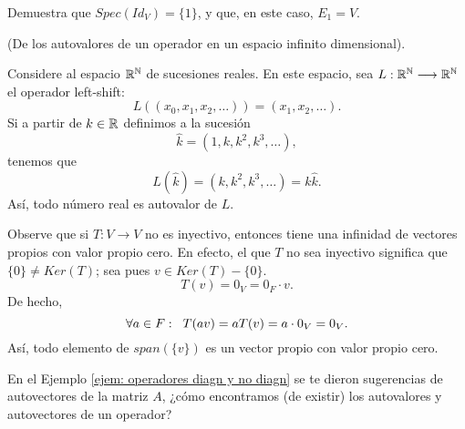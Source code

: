  Demuestra que $Spec(Id_{V}) = \{1\}$, y que, en 
este caso, $E_{1} = V$.

\begin{ejem}
	(De los autovalores de un operador en un espacio infinito dimensional).
	
	Considere al espacio $\mathbb{R}^{\mathbb{N}}$ de sucesiones reales. En este espacio,
	sea $L: \mathbb{R}^{\mathbb{N}} \longrightarrow \mathbb{R}^{\mathbb{N}}$ el operador 
	left-shift:
	\[
	L((x_{0}, x_{1}, x_{2}, \ldots  )) = (
	x_{1}, x_{2}, \ldots
	).
	\]
	Si a partir de $k \in \mathbb{R}$ definimos a la sucesión
	\[
	\hat{k} = (1, k, k^{2}, k^{3}, \ldots),
	\]
	tenemos que 
	\[
	L(\hat{k}) = (k, k^{2}, k^{3}, \ldots) = 
	k \hat{k}.
	\]
	Así, todo número real es autovalor de $L$.
\end{ejem}



\begin{ejem}
Observe que si $T: V \longrightarrow V$ no es inyectivo, entonces
tiene una infinidad de vectores propios con valor propio cero.
En efecto, el que $T$ no sea inyectivo significa que 
$\{ 0 \} \neq Ker(T)$; sea pues $v \in Ker(T)- \{ 0 \}$.
\[
T(v) = 0_{V} = 0_{F} \cdot v.
\]
De hecho, 
\[
\forall a \in F: \hspace{0.2cm} 
T(av) = a T(v) = a \cdot 0_{V} = 0_{V}.
\]
Así, todo elemento de $span(\{v\})$
es un vector propio con valor propio cero.
\end{ejem}

En el Ejemplo \ref{ejem: operadores diagn y no diagn}	
se te dieron sugerencias de autovectores de 
la matriz $A$, ¿cómo encontramos (de existir) los autovalores y autovectores
de un operador?

